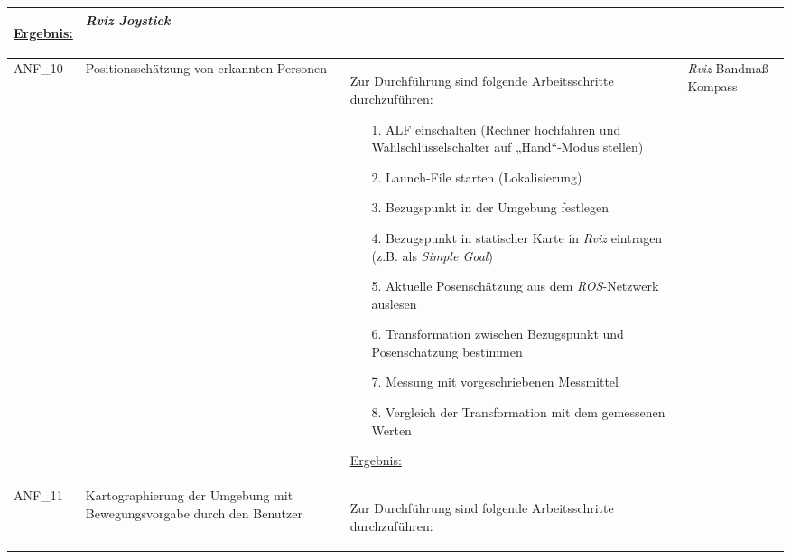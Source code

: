 \documentclass[12pt,a4paper,oneside,numbers=noenddot,captions=tableheading,toc=bibliography,openany,tikz,margin=5mm]{scrbook}
\begin{document}
\begin{longtable}{|p{}|p{}|p{7cm}|p{}|}
\begin{itemize}
		
	\end{itemize}
	
	\underline{Ergebnis:}\newline
	\newline
	
	\textbf{}%
	
	& \textit{Rviz \newline Joystick}\\

	\hline
	ANF\_10 & Positionsschätzung von erkannten Personen & Zur Durchführung sind folgende Arbeitsschritte durchzuführen:
	\begin{itemize}
		
		
		\item[1.]	ALF einschalten (Rechner hochfahren und Wahlschlüsselschalter auf „Hand“-Modus stellen)
		\item[2.]	Launch-File starten (Lokalisierung)
		\item[3.]	Bezugspunkt in der Umgebung festlegen
		\item[4.]	Bezugspunkt in statischer Karte in \textit{Rviz} eintragen (z.B. als \textit{Simple Goal})
		\item[5.]	Aktuelle Posenschätzung aus dem \textit{ROS}-Netzwerk auslesen
		\item[6.]	Transformation zwischen Bezugspunkt und Posenschätzung bestimmen
		\item[7.]	Messung mit vorgeschriebenen Messmittel
		\item[8.]	Vergleich der Transformation mit dem gemessenen Werten
		
	\end{itemize}
	
	\underline{Ergebnis:}\newline
	\newline
	
	\textbf{}%
	& \textit{Rviz}\newline
	Bandmaß\newline
	Kompass
	\\
	\hline
	ANF\_11 & Kartographierung der Umgebung mit Bewegungsvorgabe durch den Benutzer & Zur Durchführung sind folgende Arbeitsschritte durchzuführen:
		\begin{itemize}
			

\end{itemize}
\end{longtable}
\end{document}
